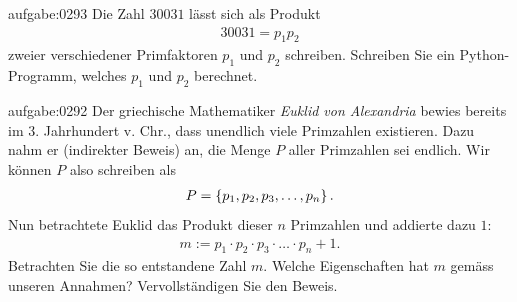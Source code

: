 \begin{aufgabe}{aufgabe:0293}
Die Zahl $30031$ lässt sich als Produkt
\begin{align*}
    30031 = p_1p_2
\end{align*}
zweier verschiedener Primfaktoren $p_1$ und $p_2$ schreiben. Schreiben Sie ein Python-Programm, welches $p_1$ und $p_2$ berechnet.
\end{aufgabe}

\begin{aufgabe}{aufgabe:0292}
Der griechische Mathematiker \textit{Euklid von Alexandria} bewies bereits im 3. Jahrhundert v. Chr., dass unendlich viele Primzahlen existieren. Dazu nahm er (indirekter Beweis) an, die Menge $P$ aller Primzahlen sei endlich. Wir können $P$ also schreiben als
\begin{align*}
    P = \left\{p_1, p_2, p_3, \ldots , p_n\right\}.
\end{align*}
Nun betrachtete Euklid das Produkt dieser $n$ Primzahlen und addierte dazu $1$:
\begin{align*}
    m := p_1\cdot p_2\cdot p_3\cdot \ldots \cdot p_n + 1.
\end{align*}
Betrachten Sie die so entstandene Zahl $m$. Welche Eigenschaften hat $m$ gemäss unseren Annahmen? Vervollständigen Sie den Beweis.
\end{aufgabe}


\clearpage
